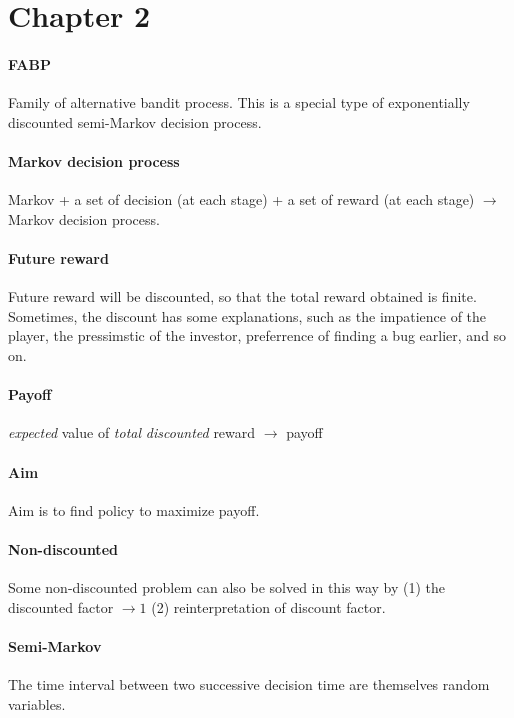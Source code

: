 \section{Chapter 2}

\paragraph{FABP} Family of alternative bandit process.
This is a special type of exponentially discounted semi-Markov decision process.

\paragraph{Markov decision process} 
Markov + a set of decision (at each stage) + a set of reward (at each stage) $\longrightarrow$ Markov decision process.

\paragraph{Future reward}
Future reward will be discounted, so that the total reward obtained is finite.
Sometimes, the discount has some explanations, such as the impatience of the player, the pressimstic of the investor,
preferrence of finding a bug earlier, and so on.

\paragraph{Payoff}
\textit{expected} value of \textit{total} \textit{discounted} reward $\longrightarrow$ payoff

\paragraph{Aim}
Aim is to find policy to maximize payoff.

\paragraph{Non-discounted}
Some non-discounted problem can also be solved in this way by (1) the discounted factor $\rightarrow 1$
(2) reinterpretation of discount factor.

\paragraph{Semi-Markov}
The time interval between two successive decision time are themselves random variables.

